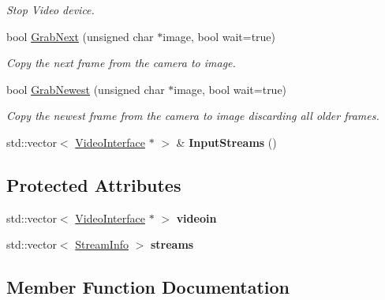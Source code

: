 \begin{DoxyCompactItemize}
\begin{DoxyCompactList}\small\item\em Stop Video device. \end{DoxyCompactList}\item 
bool \hyperlink{classpangolin_1_1_video_splitter_a733a8cdb440ddd826fb5a251a8fb868f}{Grab\+Next} (unsigned char $\ast$image, bool wait=true)
\begin{DoxyCompactList}\small\item\em Copy the next frame from the camera to image. \end{DoxyCompactList}\item 
bool \hyperlink{classpangolin_1_1_video_splitter_a332bbd9bf732f9c84dfd7e4844dbed10}{Grab\+Newest} (unsigned char $\ast$image, bool wait=true)
\begin{DoxyCompactList}\small\item\em Copy the newest frame from the camera to image discarding all older frames. \end{DoxyCompactList}\item 
std\+::vector$<$ \hyperlink{structpangolin_1_1_video_interface}{Video\+Interface} $\ast$ $>$ \& {\bfseries Input\+Streams} ()\hypertarget{classpangolin_1_1_video_splitter_a17b0a62a6a2030e1a3c88464fbe5e353}{}\label{classpangolin_1_1_video_splitter_a17b0a62a6a2030e1a3c88464fbe5e353}

\end{DoxyCompactItemize}
\subsection*{Protected Attributes}
\begin{DoxyCompactItemize}
\item 
std\+::vector$<$ \hyperlink{structpangolin_1_1_video_interface}{Video\+Interface} $\ast$ $>$ {\bfseries videoin}\hypertarget{classpangolin_1_1_video_splitter_ac19c36abd092957109c01aa9b1aac7fe}{}\label{classpangolin_1_1_video_splitter_ac19c36abd092957109c01aa9b1aac7fe}

\item 
std\+::vector$<$ \hyperlink{classpangolin_1_1_stream_info}{Stream\+Info} $>$ {\bfseries streams}\hypertarget{classpangolin_1_1_video_splitter_ac09a58523cc0080c3baec6b6d2f60c46}{}\label{classpangolin_1_1_video_splitter_ac09a58523cc0080c3baec6b6d2f60c46}

\end{DoxyCompactItemize}


\subsection{Member Function Documentation}
